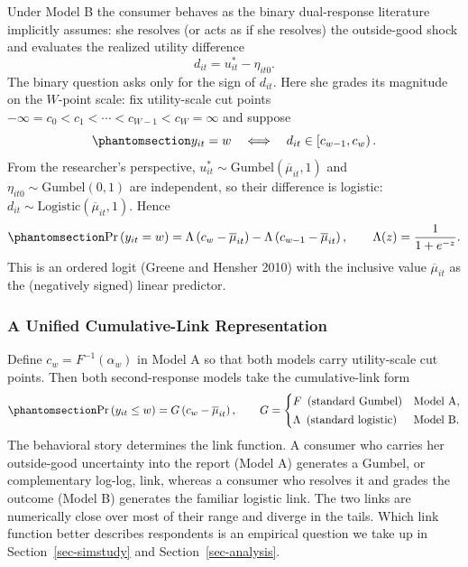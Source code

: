 \documentclass[
  letterpaper,
  DIV=11,
  numbers=noendperiod]{scrartcl}
\theoremstyle{plain}
\theoremstyle{plain}
\theoremstyle{remark}
\begin{document}
Under Model B the consumer behaves as the binary dual-response
literature implicitly assumes: she resolves (or acts as if she resolves)
the outside-good shock and evaluates the realized utility difference \[
d_{it} = u^*_{it} - \eta_{it0}.
\] The binary question asks only for the sign of \(d_{it}\). Here she
grades its magnitude on the \(W\)-point scale: fix utility-scale cut
points \(-\infty = c_0 < c_1 < \cdots < c_{W-1} < c_W = \infty\) and
suppose \begin{equation}\protect\phantomsection\label{eq-reportruleB}{
y_{it} = w
\quad \Longleftrightarrow \quad
d_{it} \in \left[ c_{w-1}, c_w \right).
}\end{equation} From the researcher's perspective,
\(u^*_{it} \sim \text{Gumbel}(\overline{\mu}_{it},1)\) and
\(\eta_{it0} \sim \text{Gumbel}(0,1)\) are independent, so their
difference is logistic:
\(d_{it} \sim \text{Logistic}\left( \overline{\mu}_{it}, 1 \right)\).
Hence \begin{equation}\protect\phantomsection\label{eq-modelB}{
\Pr \left( y_{it} = w \right)
= \Lambda \left( c_w - \overline{\mu}_{it} \right) - \Lambda \left( c_{w-1} - \overline{\mu}_{it} \right),
\qquad
\Lambda(z) = \frac{1}{1+e^{-z}}.
}\end{equation} This is an ordered logit (Greene and Hensher 2010) with
the inclusive value \(\overline{\mu}_{it}\) as the (negatively signed)
linear predictor.

\subsubsection{A Unified Cumulative-Link
Representation}\label{a-unified-cumulative-link-representation}

Define \(c_w = F^{-1}(\alpha_w)\) in Model A so that both models carry
utility-scale cut points. Then both second-response models take the
cumulative-link form
\begin{equation}\protect\phantomsection\label{eq-cumlink}{
\Pr \left( y_{it} \le w \right) = G \left( c_w - \overline{\mu}_{it} \right),
\qquad
G = \begin{cases}
F \ \left(\text{standard Gumbel}\right) & \text{Model A}, \\[2pt]
\Lambda \ \left(\text{standard logistic}\right) & \text{Model B}.
\end{cases}
}\end{equation} The behavioral story determines the link function. A
consumer who carries her outside-good uncertainty into the report (Model
A) generates a Gumbel, or complementary log-log, link, whereas a
consumer who resolves it and grades the outcome (Model B) generates the
familiar logistic link. The two links are numerically close over most of
their range and diverge in the tails. Which link function better
describes respondents is an empirical question we take up in
Section~\ref{sec-simstudy} and Section~\ref{sec-analysis}.
\end{document}
